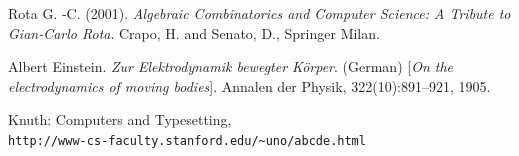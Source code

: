 \documentclass{article}%
\begin{document}
\begin{thebibliography}{9}
Rota G. -C. (2001).
\textit{Algebraic Combinatorics and Computer Science: A Tribute to Gian-Carlo Rota}.
Crapo, H. and Senato, D., Springer Milan.

Albert Einstein. 
\textit{Zur Elektrodynamik bewegter K{\"o}rper}. (German) 
[\textit{On the electrodynamics of moving bodies}]. 
Annalen der Physik, 322(10):891–921, 1905.

Knuth: Computers and Typesetting,
\\\texttt{http://www-cs-faculty.stanford.edu/\~{}uno/abcde.html}

\end{thebibliography}
\end{document}
